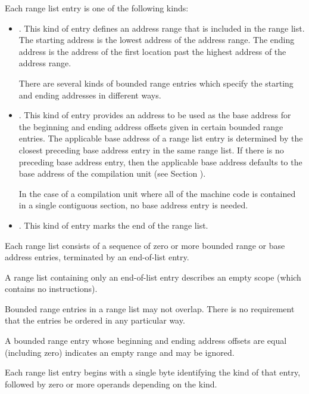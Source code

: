 Each range list entry is one of the following kinds:
\begin{itemize}
\item {}. 
This kind of entry defines an address range
that is included in the range list. The starting address is
the lowest address of the address range. The ending address
is the address of the first location past the highest address
of the address range.
       
There are several kinds of bounded range entries which specify
the starting and ending addresses in different ways.
\item {}.
This kind of entry provides an address to be
used as the base address for the beginning and ending
address offsets given in certain bounded range entries. The
applicable base address of a range list entry is
determined by the closest preceding base address
entry in the same range list. If there is no preceding
base address entry, then the applicable base address
defaults to the base address of the compilation unit (see 
Section ).

In the case of a compilation unit where all of the machine
code is contained in a single contiguous section, no base
address entry is needed.

\item {}. 
This kind of entry marks the end of the range list.

\end{itemize}

Each range list consists of a sequence of zero or more bounded
range or base address entries, terminated by an end-of-list entry.

A range list containing only an end-of-list entry describes an
empty scope (which contains no instructions).
   
Bounded range entries in a range list may not overlap. There is
no requirement that the entries be ordered in any particular way.

A bounded range entry whose beginning and ending address offsets
are equal (including zero) indicates an empty range and may be
ignored.
   
Each range list entry begins with a single byte identifying the kind
of that entry, followed by zero or more operands depending on the
kind.

